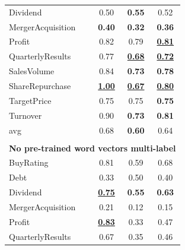 \documentclass[11pt,a4paper]{article}
\begin{document}
\begin{table}[!htb]
{\begin{tabular}{p{2.8cm} c c c}
			Dividend             & 0.50                      & \textbf{0.55}             & 0.52                       \\
			MergerAcquisition    & \textbf{0.40}             & \textbf{0.32 }            & \textbf{0.36}              \\
			Profit               & 0.82                      & 0.79                      & \underline{\textbf{0.81}}  \\
			QuarterlyResults     & 0.77                      & \underline{\textbf{0.68}} & \underline{\textbf{0.72}}  \\
			SalesVolume          & 0.84                      & \textbf{0.73}             & \textbf{0.78}              \\
			ShareRepurchase      & \underline{\textbf{1.00}} & \underline{\textbf{0.67}} & \underline{\textbf{0.80} } \\
			TargetPrice          & 0.75                      & 0.75                      & \textbf{0.75}              \\
			Turnover             & 0.90                      & \textbf{0.73}             & \textbf{0.81}              \\
			\hdashline
			avg                  & 0.68                      & \textbf{0.60}             & 0.64                       \\
			\\
			\multicolumn{4}{c}{\textbf{No pre-trained word vectors multi-label} } \\
			\hline
			BuyRating            & 0.81                      & 0.59                      & 0.68                       \\
			Debt                 & 0.33                      & 0.50                      & 0.40                       \\
			Dividend             & \underline{\textbf{0.75}} & \textbf{0.55}             & \textbf{0.63}              \\
			MergerAcquisition    & 0.21                      & 0.12                      & 0.15                       \\
			Profit               & \underline{\textbf{0.83}} & 0.33                      & 0.47                       \\
			QuarterlyResults     & 0.67                      & 0.35                      & 0.46                       \\

\end{tabular}}
\end{table}
\end{document}
